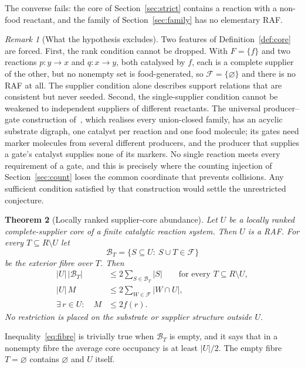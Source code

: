 \documentclass[11pt,a4paper]{article}
\theoremstyle{plain}
\newtheorem{theorem}{Theorem}[section]
\theoremstyle{definition}
\theoremstyle{remark}
\newtheorem{remark}[theorem]{Remark}
\newcommand{\FF}{\mathcal F}
\newcommand{\BB}{\mathcal B}
\begin{document}
The converse fails: the core of Section~\ref{sec:strict} contains a reaction with a non-food reactant, and the family of Section~\ref{sec:family} has no elementary RAF.

\begin{remark}[What the hypothesis excludes]\label{rem:excludes}
Two features of Definition~\ref{def:core} are forced. First, the rank condition cannot be dropped. With $F=\{f\}$ and two reactions $p:y\to x$ and $q:x\to y$, both catalysed by $f$, each is a complete supplier of the other, but no nonempty set is food-generated, so $\FF=\{\varnothing\}$ and there is no RAF at all. The supplier condition alone describes support relations that are consistent but never seeded. Second, the single-supplier condition cannot be weakened to independent suppliers of different reactants. The universal producer--gate construction of~\cite{elementary2026}, which realises every union-closed family, has an acyclic substrate digraph, one catalyst per reaction and one food molecule; its gates need marker molecules from several different producers, and the producer that supplies a gate's catalyst supplies none of its markers. No single reaction meets every requirement of a gate, and this is precisely where the counting injection of Section~\ref{sec:count} loses the common coordinate that prevents collisions. Any sufficient condition satisfied by that construction would settle the unrestricted conjecture.
\end{remark}

\begin{theorem}[Locally ranked supplier-core abundance]\label{thm:main}
Let $U$ be a locally ranked complete-supplier core of a finite catalytic reaction system. Then $U$ is a RAF. For every $T\subseteq R\setminus U$ let
\begin{equation}\label{eq:fibredef}
 \BB_T=\{S\subseteq U:\ S\cup T\in\FF\}
\end{equation}
be the exterior fibre over $T$. Then
\begin{align}
 |U|\,|\BB_T|&\le2\sum_{S\in\BB_T}|S|\qquad\text{for every }T\subseteq R\setminus U,\label{eq:fibre}\\
 |U|\,M&\le2\sum_{W\in\FF}|W\cap U|,\label{eq:global}\\
 \exists\,r\in U:\quad M&\le2f(r).\label{eq:witness}
\end{align}
No restriction is placed on the substrate or supplier structure outside $U$.
\end{theorem}

Inequality~\eqref{eq:fibre} is trivially true when $\BB_T$ is empty, and it says that in a nonempty fibre the average core occupancy is at least $|U|/2$. The empty fibre $T=\varnothing$ contains $\varnothing$ and $U$ itself.
\end{document}
